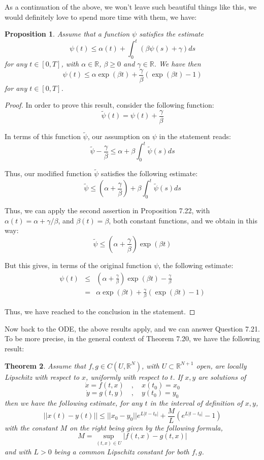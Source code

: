 \documentclass[12pt]{amsbook}
\newtheorem{theorem}{Theorem}[chapter]
\newtheorem{proposition}[theorem]{Proposition}
\begin{document}
As a continuation of the above, we won't leave such beautiful things like this, we would definitely love to spend more time with them, we have:

\begin{proposition}
Assume that a function $\psi$ satisfies the estimate
$$\psi(t)\leq\alpha(t)+\int_0^t(\beta\psi(s)+\gamma)ds$$
for any $t\in[0,T]$, with $\alpha\in\mathbb R$, $\beta\geq 0$ and $\gamma\in\mathbb R$. We have then
$$\psi(t)\leq\alpha\exp(\beta t)+\frac{\gamma}{\beta}(\exp(\beta t)-1)$$
for any $t\in[0,T]$. 
\end{proposition}

\begin{proof}
In order to prove this result, consider the following function:
$$\widetilde{\psi}(t)=\psi(t)+\frac{\gamma}{\beta}$$

In terms of this function $\widetilde{\psi}$, our assumption on $\psi$ in the statement reads: 
$$\widetilde{\psi}-\frac{\gamma}{\beta}\leq\alpha+\beta\int_0^t\widetilde{\psi}(s)ds$$

Thus, our modified function $\widetilde{\psi}$ satisfies the following estimate: 
$$\widetilde{\psi}\leq\left(\alpha+\frac{\gamma}{\beta}\right)+\beta\int_0^t\widetilde{\psi}(s)ds$$

Thus, we can apply the second assertion in Proposition 7.22, with $\alpha(t)=\alpha+\gamma/\beta$, and $\beta(t)=\beta$, both constant functions, and we obtain in this way:
$$\widetilde{\psi}\leq\left(\alpha+\frac{\gamma}{\beta}\right)\exp(\beta t)$$

But this gives, in terms of the original function $\psi$, the following estimate:
\begin{eqnarray*}
\psi(t)
&\leq&\left(\alpha+\frac{\gamma}{\beta}\right)\exp(\beta t)-\frac{\gamma}{\beta}\\
&=&\alpha\exp(\beta t)+\frac{\gamma}{\beta}(\exp(\beta t)-1)
\end{eqnarray*}

Thus, we have reached to the conclusion in the statement.
\end{proof}

Now back to the ODE, the above results apply, and we can answer Question 7.21. To be more precise, in the general context of Theorem 7.20, we have the following result:

\begin{theorem}
Assume that $f,g\in C(U,\mathbb R^N)$, with $U\subset\mathbb R^{N+1}$ open, are locally Lipschitz with respect to $x$, uniformly with respect to $t$. If $x,y$ are solutions of
$$\dot{x}=f(t,x)\quad,\quad x(t_0)=x_0$$
$$\dot{y}=g(t,y)\quad,\quad y(t_0)=y_0$$
then we have the following estimate, for any $t$ in the interval of definition of $x,y$,
$$||x(t)-y(t)||\leq||x_0-y_0||e^{L|t-t_0|}+\frac{M}{L}\left(e^{L|t-t_0|}-1\right)$$
with the constant $M$ on the right being given by the following formula,
$$M=\sup_{(t,x)\in U}|f(t,x)-g(t,x)|$$
and with $L>0$ being a common Lipschitz constant for both $f,g$.
\end{theorem}
\end{document}
